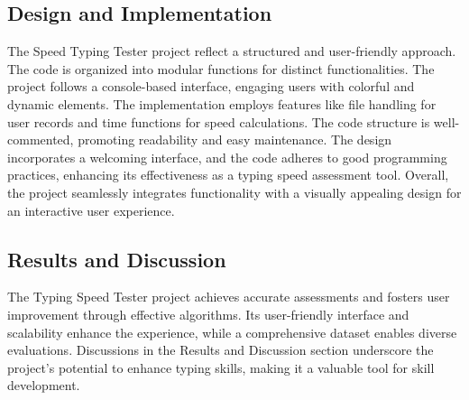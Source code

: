 \subsection{Design and Implementation}
The  Speed Typing Tester project reflect a structured and user-friendly approach. The code is organized into modular functions for distinct functionalities. The project follows a console-based interface, engaging users with colorful and dynamic elements. The implementation employs features like file handling for user records and time functions for speed calculations. The code structure is well-commented, promoting readability and easy maintenance. The design incorporates a welcoming interface, and the code adheres to good programming practices, enhancing its effectiveness as a typing speed assessment tool. Overall, the project seamlessly integrates functionality with a visually appealing design for an interactive user experience.






\subsection{Results and Discussion}

The Typing Speed Tester project achieves accurate assessments and fosters user improvement through effective algorithms. Its user-friendly interface and scalability enhance the experience, while a comprehensive dataset enables diverse evaluations. Discussions in the Results and Discussion section underscore the project's potential to enhance typing skills, making it a valuable tool for skill development.

